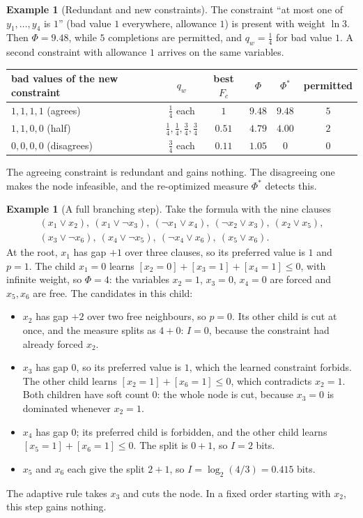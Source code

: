 \documentclass[11pt,a4paper]{article}
\theoremstyle{definition}
\newtheorem{example}[lemma]{Example}
\begin{document}
\begin{example}[Redundant and new constraints]\label{ex:B}
The constraint ``at most one of $y_1,\dots,y_4$ is $1$'' (bad value $1$
everywhere, allowance $1$) is present with weight $\ln3$. Then $\Phi=9.48$,
while $5$ completions are permitted, and $q_w=\frac14$ for bad value $1$. A
second constraint with allowance $1$ arrives on the same variables.

\medskip
\centering
\begin{tabular}{lccccc}
\toprule
bad values of the new constraint & $q_w$ & best $F_c$ & $\Phi$ &
$\Phi^*$ & permitted\\
\midrule
$1,1,1,1$ (agrees) & $\frac14$ each & $1$ & $9.48$ & $9.48$ & $5$\\
$1,1,0,0$ (half) & $\frac14,\frac14,\frac34,\frac34$ & $0.51$ & $4.79$ &
$4.00$ & $2$\\
$0,0,0,0$ (disagrees) & $\frac34$ each & $0.11$ & $1.05$ & $0$ & $0$\\
\bottomrule
\end{tabular}
\par\medskip
\raggedright
The agreeing constraint is redundant and gains nothing. The disagreeing one
makes the node infeasible, and the re-optimized measure $\Phi^*$ detects this.
\end{example}

\begin{example}[A full branching step]\label{ex:C}
Take the formula with the nine clauses
\begin{gather*}
 (x_1\lor x_2),\ (x_1\lor\neg x_3),\ (\neg x_1\lor x_4),\
 (\neg x_2\lor x_3),\ (x_2\lor x_5),\\
 (x_3\lor\neg x_6),\ (x_4\lor\neg x_5),\ (\neg x_4\lor x_6),\
 (x_5\lor x_6).
\end{gather*}
At the root, $x_1$ has gap $+1$ over three clauses, so its preferred value is
$1$ and $p=1$. The child $x_1=0$ learns $[x_2=0]+[x_3=1]+[x_4=1]\le0$,
with infinite weight, so $\Phi=4$: the variables $x_2=1$, $x_3=0$, $x_4=0$
are forced and $x_5,x_6$ are free. The candidates in this child:
\begin{itemize}
 \item $x_2$ has gap $+2$ over two free neighbours, so $p=0$. Its other child
 is cut at once, and the measure splits as $4+0$: $I=0$, because the
 constraint had already forced $x_2$.
 \item $x_3$ has gap $0$, so its preferred value is $1$, which the learned
 constraint forbids. The other child learns $[x_2=1]+[x_6=1]\le0$, which
 contradicts $x_2=1$. Both children have soft count $0$: the whole node is
 cut, because $x_3=0$ is dominated whenever $x_2=1$.
 \item $x_4$ has gap $0$; its preferred child is forbidden, and the other
 child learns $[x_5=1]+[x_6=1]\le0$. The split is $0+1$, so $I=2$ bits.
 \item $x_5$ and $x_6$ each give the split $2+1$, so $I=\log_2(4/3)=0.415$
 bits.
\end{itemize}
The adaptive rule takes $x_3$ and cuts the node. In a fixed order starting
with $x_2$, this step gains nothing.
\end{example}
\end{document}
